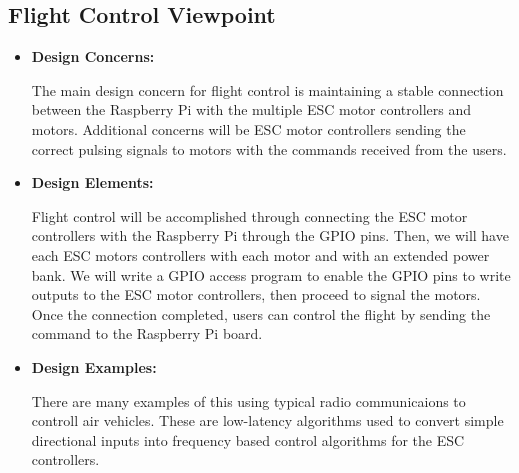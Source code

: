 \documentclass[onecolumn, draftclsnofoot,10pt, compsoc]{IEEEtran}
\begin{document}
\subsection{Flight Control Viewpoint} %
\begin{itemize}
\item{ \textbf{Design Concerns:}}

The main design concern for flight control is maintaining a stable connection between the Raspberry Pi with the multiple ESC motor controllers and motors. Additional concerns will be ESC motor controllers sending the correct pulsing signals to motors with the commands received from the users. \\
\item{ \textbf{Design Elements:}}

Flight control will be accomplished through connecting the ESC motor controllers with the Raspberry Pi through the GPIO pins. Then, we will have each ESC motors controllers with each motor and with an extended power bank. We will write a GPIO access program to enable the GPIO pins to write outputs to the ESC motor controllers, then proceed to signal the motors. Once the connection completed, users can control the flight by sending the command to the Raspberry Pi board.\\

\item{ \textbf{Design Examples:}} %

There are many examples of this using typical radio communicaions to controll air vehicles. These are low-latency algorithms used to convert simple directional inputs into frequency based control algorithms for the ESC controllers. \\

\end{itemize}
\end{document}
